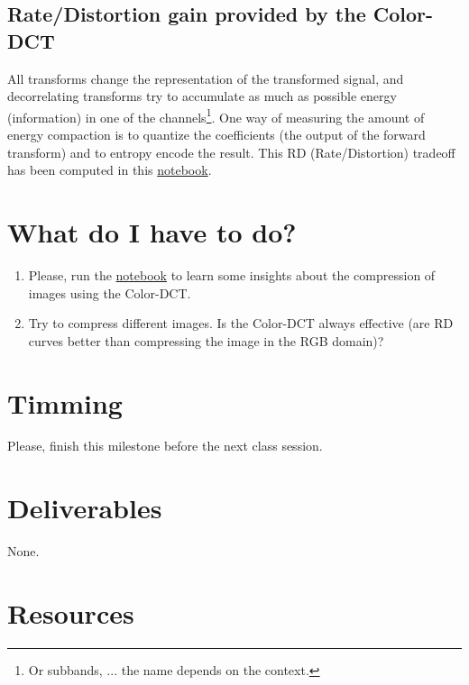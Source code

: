 


\subsection{Rate/Distortion gain provided by the Color-DCT}

All transforms change the representation of the transformed signal,
and decorrelating transforms try to accumulate as much as possible
energy (information) in one of the channels\footnote{Or subbands,
... the name depends on the context.}. One way of measuring the amount
of energy compaction is to quantize the coefficients (the output of
the forward transform) and to entropy encode the result. This RD
(Rate/Distortion) tradeoff has been computed in this
\href{https://github.com/Sistemas-Multimedia/Sistemas-Multimedia.github.io/blob/master/contents/color_DCT/RD_performance.ipynb}{notebook}.

\section{What do I have to do?}

\begin{enumerate}
\item Please, run the
  \href{https://github.com/Sistemas-Multimedia/Sistemas-Multimedia.github.io/blob/master/contents/color_DCT/RD_performance.ipynb}{notebook}
  to learn some insights about the compression of images using the Color-DCT.
\item Try to compress different images. Is the Color-DCT always
  effective (are RD curves better than compressing the image in
  the RGB domain)?
\end{enumerate}

\section{Timming}

Please, finish this milestone before the next class session.

\section{Deliverables}

None.

\section{Resources}

\renewcommand{\addcontentsline}[3]{}%

